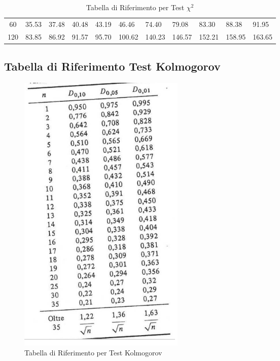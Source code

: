 \begin{table}[H]
{\begin{tabular}{ c | l l l l l l l l l l}
            60                   & 35.53                  & 37.48              & 40.48                  & 43.19                & 46.46                 & 74.40                 & 79.08                 & 83.30                   & 88.38                 & 91.95                   \\
            120                  & 83.85                  & 86.92              & 91.57                  & 95.70                & 100.62                & 140.23                & 146.57                & 152.21                  & 158.95                & 163.65                  \\
        \end{tabular}}
    \caption{Tabella di Riferimento per Test $\chi^2$}
\end{table}

\subsection{Tabella di Riferimento Test Kolmogorov}

\begin{figure}[H]
    \centering
    \includegraphics[width=8cm, keepaspectratio]{capitoli/goodnes_of_fit/imgs/kolmtable.png}
    \caption{Tabella di Riferimento per Test Kolmogorov}
    \label{kolmogorov-tabella}
\end{figure}

